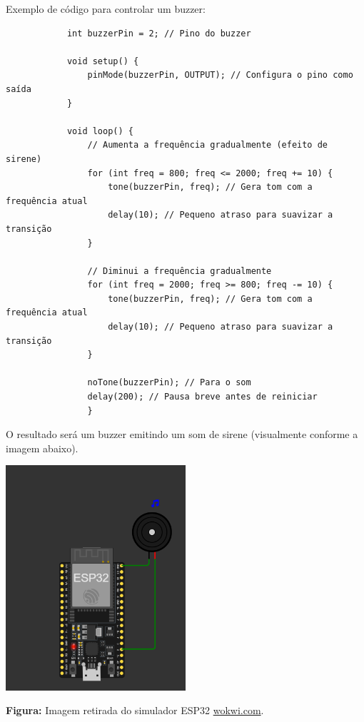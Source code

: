 \documentclass[a4paper]{article}
\begin{document}
\begin{answer}
\begin{enumerate}
                Exemplo de código para controlar um buzzer:

            \begin{verbatim}
            int buzzerPin = 2; // Pino do buzzer

            void setup() {
                pinMode(buzzerPin, OUTPUT); // Configura o pino como saída
            }

            void loop() {
                // Aumenta a frequência gradualmente (efeito de sirene)
                for (int freq = 800; freq <= 2000; freq += 10) {
                    tone(buzzerPin, freq); // Gera tom com a frequência atual
                    delay(10); // Pequeno atraso para suavizar a transição
                }
                
                // Diminui a frequência gradualmente
                for (int freq = 2000; freq >= 800; freq -= 10) {
                    tone(buzzerPin, freq); // Gera tom com a frequência atual
                    delay(10); // Pequeno atraso para suavizar a transição
                }
                
                noTone(buzzerPin); // Para o som
                delay(200); // Pausa breve antes de reiniciar
                }
            \end{verbatim}
            O resultado será um buzzer emitindo um som de sirene (visualmente conforme a imagem abaixo).
            \begin{center}
                \includegraphics[width=0.5\textwidth]{images/buzzer.png}
            \end{center}
            \begin{center}
                \small
                \textbf{Figura:} Imagem retirada do simulador ESP32 \href{https://wokwi.com}{wokwi.com}.
            \end{center}
        \end{enumerate}
    \end{answer}
\end{document}
